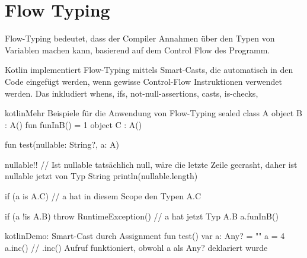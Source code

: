 
\section{Flow Typing}\label{sec:flow-typing}

\renewcommand{\kapitelautor}{Autor: Marvin Kurka}

Flow-Typing bedeutet, dass der Compiler Annahmen über den Typen von Variablen machen kann, basierend auf dem Control
Flow des Programm.


Kotlin implementiert Flow-Typing mittels Smart-Casts, die automatisch in den Code eingefügt werden, wenn gewisse
Control-Flow Instruktionen verwendet werden.
Das inkludiert \zB whens, ifs, not-null-assertions, casts, is-checks, \usw

\begin{codeBlock}{kotlin}{Mehr Beispiele für die Anwendung von Flow-Typing}
sealed class A {
    object B : A() {
        fun funInB() = 1
    }
    object C : A()
}

fun test(nullable: String?, a: A) {
    nullable!!
    // Ist nullable tatsächlich null, wäre die letzte Zeile gecrasht, daher ist nullable jetzt von Typ String
    println(nullable.length)

    if (a is A.C) {
        // a hat in diesem Scope den Typen A.C
    }

    if (a !is A.B) throw RuntimeException()
    // a hat jetzt Typ A.B
    a.funInB()
}
\end{codeBlock}

\begin{codeBlock}{kotlin}{Demo: Smart-Cast durch Assignment}
fun test() {
    var a: Any? = ""
    a = 4
    a.inc() // .inc() Aufruf funktioniert, obwohl a als Any? deklariert wurde
}
\end{codeBlock}

